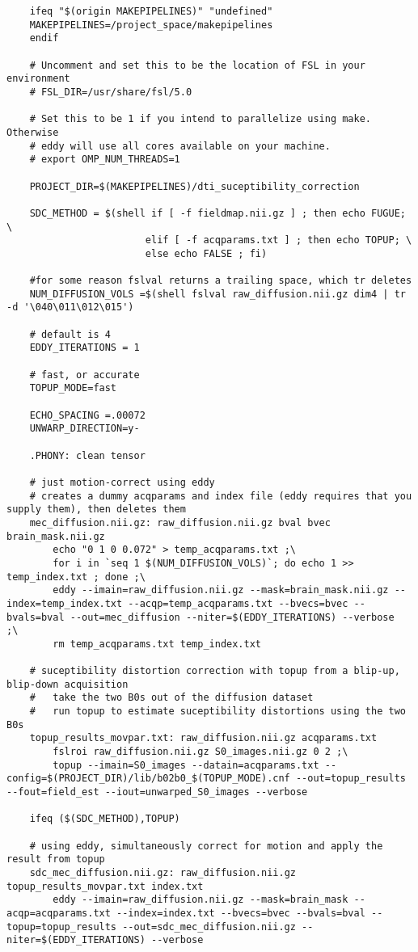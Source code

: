 \begin{lstlisting}
	ifeq "$(origin MAKEPIPELINES)" "undefined"
	MAKEPIPELINES=/project_space/makepipelines
	endif

	# Uncomment and set this to be the location of FSL in your environment
	# FSL_DIR=/usr/share/fsl/5.0

	# Set this to be 1 if you intend to parallelize using make. Otherwise
	# eddy will use all cores available on your machine. 
	# export OMP_NUM_THREADS=1

	PROJECT_DIR=$(MAKEPIPELINES)/dti_suceptibility_correction

	SDC_METHOD = $(shell if [ -f fieldmap.nii.gz ] ; then echo FUGUE; \
	                    elif [ -f acqparams.txt ] ; then echo TOPUP; \
	                    else echo FALSE ; fi)

	#for some reason fslval returns a trailing space, which tr deletes
	NUM_DIFFUSION_VOLS =$(shell fslval raw_diffusion.nii.gz dim4 | tr -d '\040\011\012\015')

	# default is 4
	EDDY_ITERATIONS = 1

	# fast, or accurate
	TOPUP_MODE=fast

	ECHO_SPACING =.00072
	UNWARP_DIRECTION=y-

	.PHONY: clean tensor

	# just motion-correct using eddy
	# creates a dummy acqparams and index file (eddy requires that you supply them), then deletes them
	mec_diffusion.nii.gz: raw_diffusion.nii.gz bval bvec brain_mask.nii.gz
		echo "0 1 0 0.072" > temp_acqparams.txt ;\
		for i in `seq 1 $(NUM_DIFFUSION_VOLS)`; do echo 1 >> temp_index.txt ; done ;\
		eddy --imain=raw_diffusion.nii.gz --mask=brain_mask.nii.gz --index=temp_index.txt --acqp=temp_acqparams.txt --bvecs=bvec --bvals=bval --out=mec_diffusion --niter=$(EDDY_ITERATIONS) --verbose  ;\
		rm temp_acqparams.txt temp_index.txt

	# suceptibility distortion correction with topup from a blip-up, blip-down acquisition
	# 	take the two B0s out of the diffusion dataset
	# 	run topup to estimate suceptibility distortions using the two B0s
	topup_results_movpar.txt: raw_diffusion.nii.gz acqparams.txt
		fslroi raw_diffusion.nii.gz S0_images.nii.gz 0 2 ;\
		topup --imain=S0_images --datain=acqparams.txt --config=$(PROJECT_DIR)/lib/b02b0_$(TOPUP_MODE).cnf --out=topup_results --fout=field_est --iout=unwarped_S0_images --verbose

	ifeq ($(SDC_METHOD),TOPUP)

	# using eddy, simultaneously correct for motion and apply the result from topup
	sdc_mec_diffusion.nii.gz: raw_diffusion.nii.gz topup_results_movpar.txt index.txt
		eddy --imain=raw_diffusion.nii.gz --mask=brain_mask --acqp=acqparams.txt --index=index.txt --bvecs=bvec --bvals=bval --topup=topup_results --out=sdc_mec_diffusion.nii.gz --niter=$(EDDY_ITERATIONS) --verbose


\end{lstlisting}
